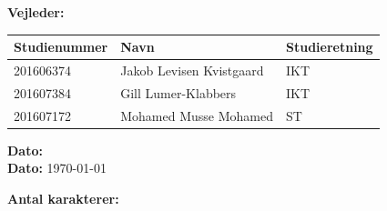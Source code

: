 \begin{center}
	\ifdefined\frontpageSupervisor
	\textbf{Vejleder:} \frontpageSupervisor\\
	\fi
	\vspace{10pt}
	\begin{tabular}{|l|l|l|}
		\hline
		\rowcolor{blue!25}
		\textbf{Studienummer} & \textbf{Navn} & \textbf{Studieretning} \\ [2pt]
		\hline
		201606374 & Jakob Levisen Kvistgaard & IKT \\
		\hline
		201607384 & Gill Lumer-Klabbers & IKT \\
		\hline
		201607172 & Mohamed Musse Mohamed & ST \\
		\hline
	\end{tabular}

	\ifdefined\frontPageDate
		{
			\fontsize{10pt}{0}\selectfont
			\textbf{Dato: } \frontPageDate\\
		}
	\else
		{
			\fontsize{10pt}{0}\selectfont
			\textbf{Dato: } \today\\
		}	
	\fi
	\vspace{5pt}
	
	\ifdefined\frontpageCharacters
		\textbf{Antal karakterer: } \frontpageCharacters\\
	\fi
	\vspace{30pt}

\end{center}
\newpage